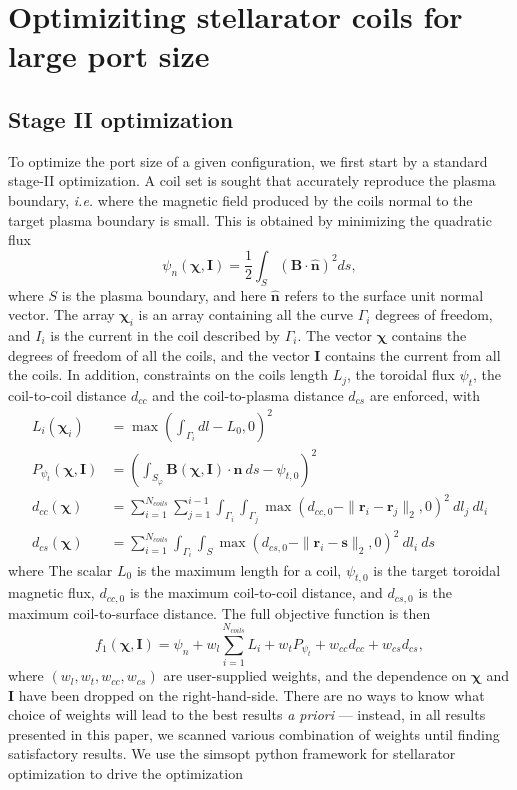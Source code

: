 \documentclass[12pt]{article}
\begin{document}
\section{Optimiziting stellarator coils for large port size}
\subsection{Stage II optimization}
To optimize the port size of a given configuration, we first start by a standard stage-II optimization. A coil set is sought that accurately reproduce the plasma boundary, \textit{i.e.} where the magnetic field produced by the coils normal to the target plasma boundary is small. This is obtained by minimizing the quadratic flux
\begin{equation}
    \psi_n(\boldsymbol\chi, \mathbf{I}) = \frac{1}{2} \int_{S} (\mathbf{B}\cdot \hat{\mathbf{n}})^2 ds, \label{eq.quadratic_flux}
\end{equation}
where $S$ is the plasma boundary, and here $\mathbf{\hat{n}}$ refers to the surface unit normal vector. The array $\boldsymbol\chi_i$ is an array containing all the curve $\Gamma_i$ degrees of freedom, and $I_i$ is the current in the coil described by $\Gamma_i$. The vector $\boldsymbol{\chi}$ contains the degrees of freedom of all the coils, and the vector $\mathbf{I}$ contains the current from all the coils.  In addition, constraints on the coils length $L_j$, the toroidal flux $\psi_t$, the coil-to-coil distance $d_{cc}$ and the coil-to-plasma distance $d_{cs}$ are enforced, with
\begin{align}
    L_i(\boldsymbol\chi_i) &= \max\left(\int_{\Gamma_i} dl - L_0, 0\right)^2\\
    P_{\psi_t}(\boldsymbol\chi, \mathbf{I}) &= \left(\int_{S_{\varphi}} \mathbf{B}(\boldsymbol\chi, \mathbf{I}) \cdot \mathbf{n} ~ds - \psi_{t,0}\right)^2\\
    d_{cc}(\boldsymbol\chi) &= \sum_{i=1}^{N_{coils}} \sum_{j = 1}^{i-1} \int_{\Gamma_i} \int_{\Gamma_j} \max(d_{cc,0} - \| \mathbf{r}_i - \mathbf{r}_j \|_2, 0)^2 ~dl_j ~dl_i\\
    d_{cs}(\boldsymbol\chi) &= \sum_{i = 1}^{N_{coils}} \int_{\Gamma_i} \int_S \max(d_{cs,0} - \| \mathbf{r}_i - \mathbf{s} \|_2, 0)^2 ~dl_i ~ds
\end{align}
where The scalar $L_0$ is the maximum length for a coil, $\psi_{t,0}$ is the target toroidal magnetic flux, $d_{cc,0}$ is the maximum coil-to-coil distance, and $d_{cs,0}$ is the maximum coil-to-surface distance. The full objective function is then
\begin{equation}
    f_1(\boldsymbol\chi,\mathbf{I}) = \psi_n + w_l\sum_{i=1}^{N_{coils}}L_i + w_tP_{\psi_t} + w_{cc}d_{cc} + w_{cs}d_{cs},
\end{equation}
where $(w_l,w_t,w_{cc},w_{cs})$ are user-supplied weights, and the dependence on $\boldsymbol{\chi}$ and $\mathbf{I}$ have been dropped on the right-hand-side. There are no ways to know what choice of weights will lead to the best results \textit{a priori} --- instead, in all results presented in this paper, we scanned various combination of weights until finding satisfactory results. We use the simsopt python framework for stellarator optimization \cite{landreman_2021} to drive the optimization
\end{document}

